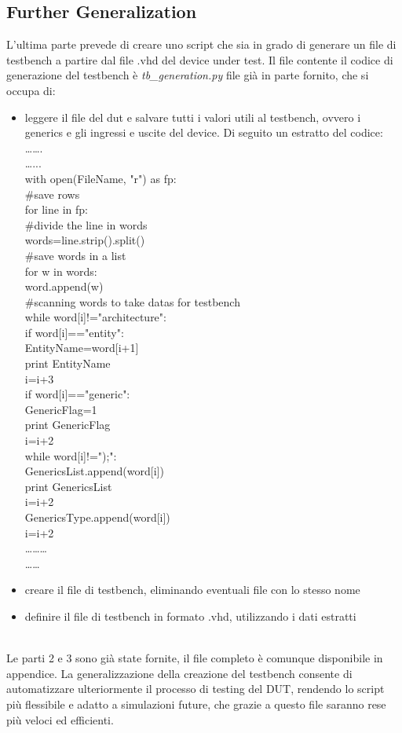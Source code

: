 \subsection{Further Generalization}
L’ultima parte prevede di creare uno script che sia in grado di generare un file di testbench a partire dal file .vhd del device under test. Il file contente il codice di generazione del testbench è \textit{tb\_generation.py} file già in parte fornito, che si occupa di:\\
\begin{itemize}
	\item{leggere il file del dut e salvare tutti i valori utili al testbench, ovvero i generics e gli ingressi e uscite del device. Di seguito un estratto del codice:\\
	…….\\
	…...\\    
	with open(FileName, "r") as fp:\\
	\#save rows\\
	for line in fp:\\
	\#divide the line in words\\
	words=line.strip().split()\\
	\#save words in a list\\
	for w in words:\\
	word.append(w)\\
	\#scanning words to take datas for testbench\\
	while word[i]!="architecture":\\
	if word[i]=="entity":\\
	EntityName=word[i+1]\\
	print EntityName\\
	i=i+3\\
	if word[i]=="generic":\\
	GenericFlag=1\\
	print GenericFlag\\
	i=i+2\\
	while word[i]!=");":\\
	GenericsList.append(word[i])\\
	print GenericsList\\
	i=i+2\\
	GenericsType.append(word[i])\\
	i=i+2\\
	………\\
	……\\}
	\item{creare il file di testbench, eliminando eventuali file con lo stesso nome}
	\item{definire il file di testbench in formato .vhd, utilizzando i dati estratti}
\end{itemize}
\\
Le parti 2 e 3 sono già state fornite, il file completo è comunque disponibile in appendice.
La generalizzazione della creazione del testbench consente di automatizzare ulteriormente il processo di testing del DUT, rendendo lo script più flessibile e adatto a simulazioni future, che grazie a questo file saranno rese più veloci ed efficienti.\\


